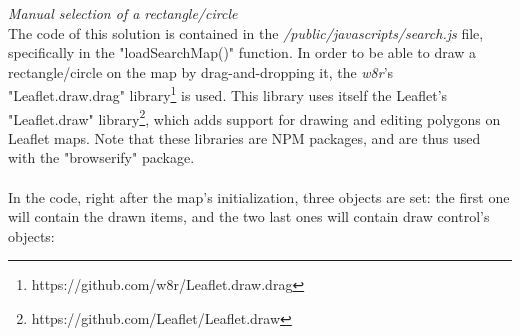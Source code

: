 \documentclass[a4paper,11pt]{report}
\begin{document}
\emph{Manual selection of a rectangle/circle}\\
The code of this solution is contained in the \emph{/public/javascripts/search.js} file, specifically in the "loadSearchMap()" function. In order to be able to draw a rectangle/circle on the map by drag-and-dropping it, the \emph{w8r}'s "Leaflet.draw.drag" library\footnote{https://github.com/w8r/Leaflet.draw.drag} is used. This library uses itself the Leaflet's "Leaflet.draw" library\footnote{https://github.com/Leaflet/Leaflet.draw}, which adds support for drawing and editing polygons on Leaflet maps. Note that these libraries are NPM packages, and are thus used with the "browserify" package.\\\\
In the code, right after the map's initialization, three objects are set: the first one will contain the drawn items, and the two last ones will contain draw control's objects:
\end{document}
